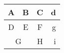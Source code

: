 \documentclass[a4paper]{article}
\begin{document}
\begin{center}
    \begin{tabular}[c]{|c|c|c|r|} 
    \hline
    A & B & C & d \\
    \hline
    D & E & F & g \\
    \hline
    \multicolumn{2}{|c|}{G} & H & i \\
    \hline
    \end{tabular}
\end{center}
\end{document}
